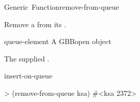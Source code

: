 \documentclass[10pt,twoside,english,pdftex]{article}
\begin{document}
\begin{functiondoc}{Generic~Function}{remove-from-queue}%
  { \returns{} }
%

\fnsyntax

\fnpurpose Remove a  from its .

\fnmethods
{}%
  {\code{(} 
   \returns{} }

\fnpackage {}

\fnmodule {}

\fnargs
\begin{args}{queue-element}
 A GBBopen  object
\end{args}

\fnreturns The supplied .

\begin{alsos}{insert-on-queue}
\end{alsos}

\fnexample
\begin{example}
> (remove-from-queue ksa)
#<ksa 2372>
\end{example}

\end{functiondoc}

\end{document}
